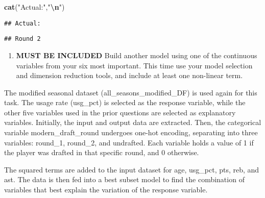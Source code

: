\documentclass[
]{article}
\newenvironment{Shaded}{\begin{snugshade}}{\end{snugshade}}
\newcommand{\FunctionTok}[1]{\textcolor[rgb]{0.13,0.29,0.53}{\textbf{#1}}}
\newcommand{\NormalTok}[1]{#1}
\newcommand{\SpecialCharTok}[1]{\textcolor[rgb]{0.81,0.36,0.00}{\textbf{#1}}}
\newcommand{\StringTok}[1]{\textcolor[rgb]{0.31,0.60,0.02}{#1}}
\providecommand{\tightlist}{%
  \setlength{\itemsep}{0pt}\setlength{\parskip}{0pt}}
\begin{document}
\begin{Shaded}
\begin{Highlighting}[]
\FunctionTok{cat}\NormalTok{(}\StringTok{"Actual:"}\NormalTok{,}\StringTok{"}\SpecialCharTok{\textbackslash{}n}\StringTok{"}\NormalTok{)}
\end{Highlighting}
\end{Shaded}

\begin{verbatim}
## Actual:
\end{verbatim}

\begin{Shaded}
\end{Shaded}

\begin{verbatim}
## Round 2
\end{verbatim}

\vspace{2cm}
\newpage

\begin{enumerate}
\def\labelenumi{\arabic{enumi})}
\setcounter{enumi}{3}
\tightlist
\item
  \textbf{MUST BE INCLUDED} Build another model using one of the
  continuous variables from your six most important. This time use your
  model selection and dimension reduction tools, and include at least
  one non-linear term.
\end{enumerate}

The modified seasonal dataset (all\_seasons\_modified\_DF) is used again
for this task. The usage rate (usg\_pct) is selected as the response
variable, while the other five variables used in the prior questions are
selected as explanatory variables. Initially, the input and output data
are extracted. Then, the categorical variable modern\_draft\_round
undergoes one-hot encoding, separating into three variables: round\_1,
round\_2, and undrafted. Each variable holds a value of 1 if the player
was drafted in that specific round, and 0 otherwise.

The squared terms are added to the input dataset for age, usg\_pct, pts,
reb, and ast. The data is then fed into a best subset model to find the
combination of variables that best explain the variation of the response
variable.
\end{document}
